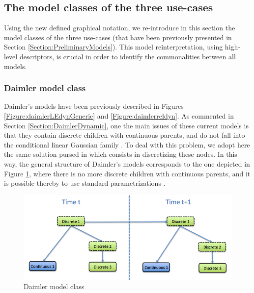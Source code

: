 
\subsection{The model classes of the three use-cases}

Using the new defined graphical notation, we re-introduce in this section the model classes of the three use-cases (that have been previously presented in Section \ref{Section:PreliminaryModels}). This model reinterpretation, using high-level descriptors, is crucial in order to identify the commonalities between all models. 

\subsubsection{Daimler model class}

Daimler's models have been previously described in Figures \ref{Figure:daimlerLEdynGeneric} and \ref{Figure:daimlerreldyn}. As commented in Section \ref{Section:DaimlerDynamic}, one the main issues of these current models is that they contain discrete children with continuous parents, and do not fall into the conditional linear Gaussian family \cite{JensenNielsen2007}. To deal with this problem, we adopt here the same solution pursed in \cite{kasper2012object} which consists in discretizing these nodes. In this way, the general structure of Daimler's models corresponds to the one depicted in Figure \ref{Figure:DaimlerModelClass}, where there is no more discrete children with continuous parents, and it is possible thereby to use standard parametrizations \cite{JensenNielsen2007}. 

\begin{figure}[ht!]
\begin{center}
\includegraphics[scale=0.4]{./figures/DaimlerModelClass}
\caption{\label{Figure:DaimlerModelClass} Daimler model class}
\end{center}
\end{figure}

